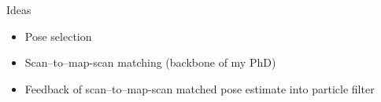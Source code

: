 \begin{frame}{Ideas}

  \begin{itemize}
    \item Pose selection
    \item Scan--to--map-scan matching (backbone of my PhD)
    \item Feedback of scan--to--map-scan matched pose estimate into particle filter
  \end{itemize}

\end{frame}
